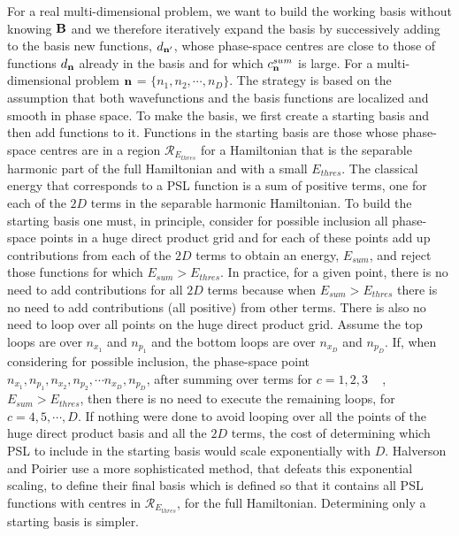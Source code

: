 %
%
For a real multi-dimensional problem, we want to build the working basis without knowing  ${\bf{   B}}$ and we therefore iteratively expand the basis  by 
successively adding to the  basis new functions, $d_{{\bf{n'}}}$,   
 whose phase-space centres are close to those of functions  $d_{{\bf{n}}}$  already in the basis and for which 
 $c^{sum}_{\bf{n}}$  is large.
For a multi-dimensional problem $  {\bf{n}} $ = $\{ n_1,n_2,   \cdots, n_D \} $.     
The  strategy is based on the  assumption  that  both wavefunctions and the basis functions  are  localized  and smooth
in phase space. 
%
%
To make the basis,  we first create a starting basis and then add functions to it.   Functions in the starting basis are those whose 
 phase-space centres are in a region      
 $\mathcal{R}_{E_{thres}} $  for a Hamiltonian that is the separable harmonic part of the full Hamiltonian and with a small $E_{thres}$.
%
The classical energy that corresponds to a PSL function is a sum of positive terms, one for each of the $2D$ 
terms in the   separable harmonic Hamiltonian.
To build the starting basis one must, in  principle, 
 consider for possible inclusion  all phase-space points in a huge direct product grid and for each of these points add up contributions 
from each of the $2D$ terms to obtain an energy, $E_{sum}$, and reject those functions for which   $E_{sum}  >  E_{thres} $.
%
 In practice,  for a given point, there is  no need to add 
contributions for all $2D$ terms because 
 when   $E_{sum}  >  E_{thres} $ there is no need to add contributions (all positive)  from other terms.   
%
There is also no need to loop over all points on the huge direct product grid.  
Assume the top loops are  over $n_{x_1}$ and $n_{p_1}$ and the bottom loops are over
 $n_{x_D}$ and $n_{p_D}$.  If, when considering for possible inclusion, 
  the         phase-space point $ n_{x_1},n_{p_1},   n_{x_2},n_{p_2},   \cdots   n_{x_D},n_{p_D} $,%
 after summing over terms  for $c=1,2,3$ ~  ,  
    $E_{sum} >  E_{thres} $,       
then there is no need to execute the remaining loops, for  $c=4,5, \cdots,  D$.
%
%
If nothing were 
 done to avoid looping over all the points of  the   huge direct product basis and all  the $2D$ terms,  the cost of determining which PSL to include in the starting basis would 
scale  exponentially with    $D$.     
 Halverson and Poirier\cite{Halverson2015} use    a more    
sophisticated method,  that defeats this exponential scaling,
to define their final basis which is defined so that it contains   all PSL functions with centres in 
 $\mathcal{R}_{E_{thres}} $,  for the full  Hamiltonian.  Determining only a starting basis is simpler.   







